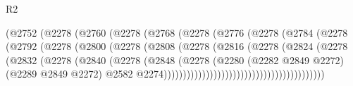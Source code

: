 \begin{lexlean}{R2}
\begin{coremodule}
                                  (@2752
                                    (@2278
                                      (@2760
                                        (@2278
                                          (@2768
                                            (@2278
                                              (@2776
                                                (@2278
                                                  (@2784
                                                    (@2278
                                                      (@2792
                                                        (@2278
                                                          (@2800
                                                            (@2278
                                                              (@2808
                                                                (@2278
                                                                  (@2816
                                                                    (@2278
                                                                      (@2824
                                                                        (@2278
                                                                          (@2832
                                                                            (@2278
                                                                              (@2840
                                                                                (@2278
                                                                                  (@2848
                                                                                    (@2278
                                                                                      (@2280
                                                                                        (@2282
                                                                                          @2849
                                                                                          @2272)
                                                                                        (@2289
                                                                                          @2849
                                                                                          @2272)
                                                                                        @2582
                                                                                        @2274))))))))))))))))))))))))))))))))))))))))))

\end{coremodule}
\end{lexlean}
